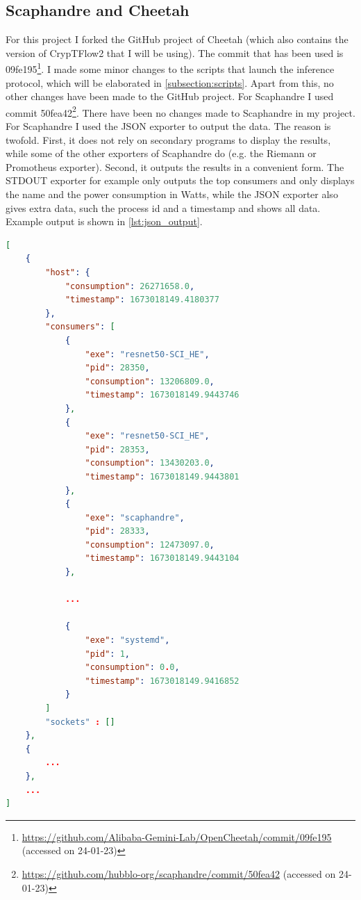 \documentclass[../thesis.tex]{subfiles}
\begin{document}
\subsection{Scaphandre and Cheetah}\label{subsection:project}
For this project I forked the GitHub project of Cheetah (which also contains the version of CrypTFlow2 that I will be using). The commit that has been used is 09fe195\footnote{\url{https://github.com/Alibaba-Gemini-Lab/OpenCheetah/commit/09fe195} (accessed on 24-01-23)}. I made some minor changes to the scripts that launch the inference protocol, which will be elaborated in \autoref{subsection:scripts}. Apart from this, no other changes have been made to the GitHub project. For Scaphandre I used commit 50fea42\footnote{\url{https://github.com/hubblo-org/scaphandre/commit/50fea42} (accessed on 24-01-23)}. There have been no changes made to Scaphandre in my project. For Scaphandre I used the JSON exporter to output the data. The reason is twofold. First, it does not rely on secondary programs to display the results, while some of the other exporters of Scaphandre do (e.g. the Riemann or Promotheus exporter). Second, it outputs the results in a convenient form. The STDOUT exporter for example only outputs the top consumers and only displays the name and the power consumption in Watts, while the JSON exporter also gives extra data, such the process id and a timestamp and shows all data.  Example output is shown in \autoref{lst:json_output}.

\begin{minipage}{\linewidth}
\begin{lstlisting}[caption={Example output of Scaphandre.}, language=JSON, label={lst:json_output}]
[
    {
        "host": {
            "consumption": 26271658.0,
            "timestamp": 1673018149.4180377
        },
        "consumers": [
            {
                "exe": "resnet50-SCI_HE",
                "pid": 28350,
                "consumption": 13206809.0,
                "timestamp": 1673018149.9443746
            },
            {
                "exe": "resnet50-SCI_HE",
                "pid": 28353,
                "consumption": 13430203.0,
                "timestamp": 1673018149.9443801
            },
            {
                "exe": "scaphandre",
                "pid": 28333,
                "consumption": 12473097.0,
                "timestamp": 1673018149.9443104
            },

            ...

            {
                "exe": "systemd",
                "pid": 1,
                "consumption": 0.0,
                "timestamp": 1673018149.9416852
            }
        ]
        "sockets" : []
    },
    {
        ...
    },
    ...
]
\end{lstlisting}
\end{minipage}
\end{document}
